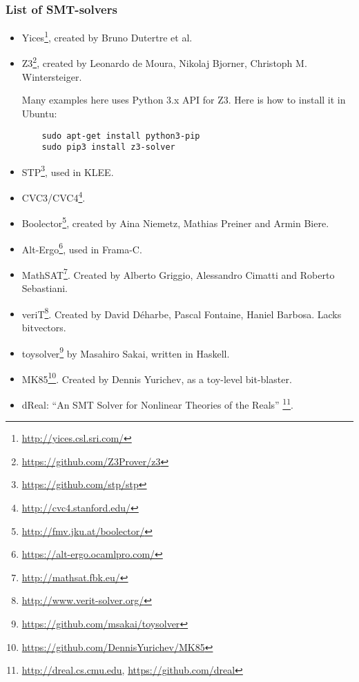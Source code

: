 \subsubsection{List of SMT-solvers}

\begin{itemize}

\item Yices\footnote{\url{http://yices.csl.sri.com/}}, created by Bruno Dutertre et al.

\item Z3\footnote{\url{https://github.com/Z3Prover/z3}},
created by Leonardo de Moura, Nikolaj Bjorner, Christoph M. Wintersteiger.

	Many examples here uses Python 3.x API for Z3.
	Here is how to install it in Ubuntu:

	\begin{lstlisting}
	sudo apt-get install python3-pip
	sudo pip3 install z3-solver
	\end{lstlisting}

\item STP\footnote{\url{https://github.com/stp/stp}}, used in KLEE.

\item CVC3/CVC4\footnote{\url{http://cvc4.stanford.edu/}}.

\item Boolector\footnote{\url{http://fmv.jku.at/boolector/}}, created by Aina Niemetz, Mathias Preiner and Armin Biere.

\item Alt-Ergo\footnote{\url{https://alt-ergo.ocamlpro.com/}}, used in Frama-C.

\item MathSAT\footnote{\url{http://mathsat.fbk.eu/}}. Created by Alberto Griggio, Alessandro Cimatti and Roberto Sebastiani.

\item veriT\footnote{\url{http://www.verit-solver.org/}}.
Created by David Déharbe, Pascal Fontaine, Haniel Barbosa.
Lacks bitvectors.

\item toysolver\footnote{\url{https://github.com/msakai/toysolver}} by Masahiro Sakai, written in Haskell.

\item MK85\footnote{\url{https://github.com/DennisYurichev/MK85}}. Created by Dennis Yurichev, as a toy-level bit-blaster.

\item dReal: ``An SMT Solver for Nonlinear Theories of the Reals''
\footnote{\url{http://dreal.cs.cmu.edu}, \url{https://github.com/dreal}}.

\end{itemize}

